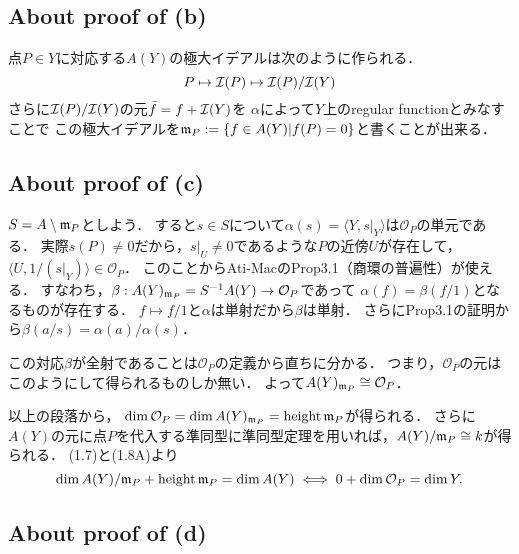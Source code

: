 \documentclass[a4paper]{jarticle}
\begin{document}
    \subsection{About proof of (b)}
    点$P \in Y$に対応する$A(Y)$の極大イデアルは次のように作られる．
    \[ P \mapsto \mathcal{I}(P) \mapsto \mathcal{I}(P)/\mathcal{I}(Y) \]
    さらに$\mathcal{I}(P)/\mathcal{I}(Y)$の元$\bar{f}=f+\mathcal{I}(Y)$を
    $\alpha$によって$Y$上のregular functionとみなすことで
    この極大イデアルを$\mathfrak{m}_P:=\{f \in A(Y) | f(P)=0 \}$と書くことが出来る．

    \subsection{About proof of (c)}
    $S=A \setminus \mathfrak{m}_P$としよう．
    すると$s \in S$について$\alpha(s)=\langle Y,s|_{Y} \rangle$は$\mathcal{O}_P$の単元である．
    実際$s(P) \neq 0$だから，$s|_{U} \neq 0$であるような$P$の近傍$U$が存在して，
    $\langle U,1/(s|_{Y}) \rangle \in \mathcal{O}_P$．
    このことからAti-MacのProp3.1（商環の普遍性）が使える．
    すなわち，$\beta: A(Y)_{\mathfrak{m}_P}=S^{-1}A(Y) \to \mathcal{O}_P$であって
    $\alpha(f)=\beta(f/1)$となるものが存在する．
    $f \mapsto f/1$と$\alpha$は単射だから$\beta$は単射．
    さらにProp3.1の証明から$\beta(a/s)=\alpha(a)/\alpha(s)$．

    この対応$\beta$が全射であることは$\mathcal{O}_P$の定義から直ちに分かる．
    つまり，$\mathcal{O}_P$の元はこのようにして得られるものしか無い．
    よって$A(Y)_{\mathfrak{m}_P} \cong \mathcal{O}_P$．

    以上の段落から，
    $\dim \mathcal{O}_P=\dim A(Y)_{\mathfrak{m}_P}=\operatorname{height} \mathfrak{m}_P$が得られる．
    さらに$A(Y)$の元に点$P$を代入する準同型に準同型定理を用いれば，$A(Y)/\mathfrak{m}_P \cong k$が得られる．
    (1.7)と(1.8A)より
    \[ \dim A(Y)/\mathfrak{m}_P+\operatorname{height} \mathfrak{m}_P=\dim A(Y) \iff 0+\dim \mathcal{O}_P=\dim Y. \]

    \subsection{About proof of (d)}
\end{document}
